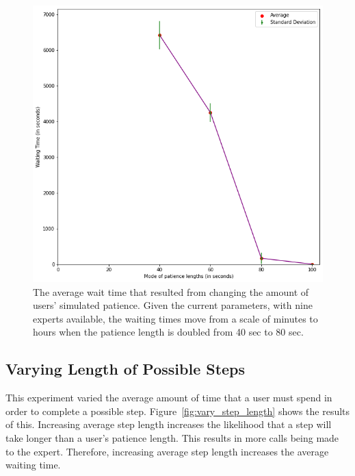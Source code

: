 \begin{figure}[H]
  \includegraphics[width=\textwidth]{figures/montecarlo/vary_patience.png}
  \caption{
    The average wait time that resulted from changing the amount of users'
    simulated patience.
    Given the current parameters, with nine experts available, the waiting times
    move from a scale of minutes to hours when the patience length is doubled
    from 40 sec to 80 sec.
  }\label{fig:vary_patience}
\end{figure}

\subsection{Varying Length of Possible Steps}

This experiment varied the average amount of time that a user must spend in
order to complete a possible step.
Figure~\ref{fig:vary_step_length} shows the results of this.
Increasing average step length increases the likelihood that a step will take
longer than a user's patience length.
This results in more calls being made to the expert.
Therefore, increasing average step length increases the average waiting time.

